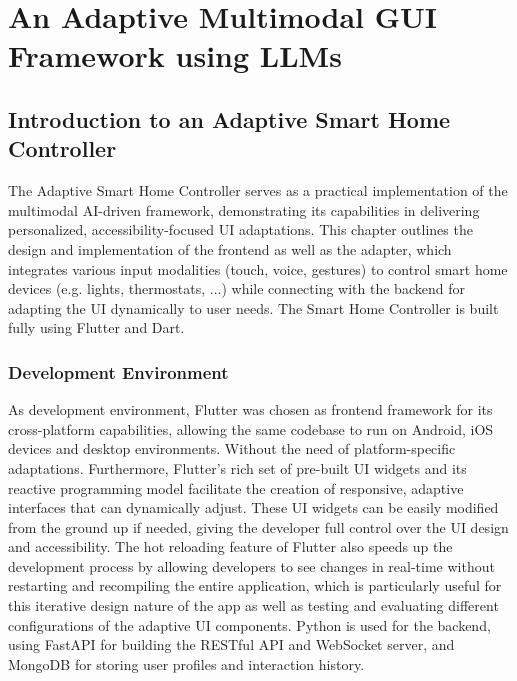 \documentclass[openany]{book}
\begin{document}
\chapter{An Adaptive Multimodal GUI Framework using LLMs}

\section{Introduction to an Adaptive Smart Home Controller}
The Adaptive Smart Home Controller serves as a practical implementation of the multimodal AI-driven framework, demonstrating its capabilities in delivering personalized, accessibility-focused UI adaptations. This chapter outlines the design and implementation of the frontend as well as the adapter, which integrates various input modalities (touch, voice, gestures) to control smart home devices (e.g. lights, thermostats, ...) while connecting with the backend for adapting the UI dynamically to user needs. The Smart Home Controller is built fully using Flutter and Dart.

\subsection{Development Environment}
As development environment, Flutter was chosen as frontend framework for its cross-platform capabilities, allowing the same codebase to run on Android, iOS devices and desktop environments. Without the need of platform-specific adaptations. Furthermore, Flutter's rich set of pre-built UI widgets and its reactive programming model facilitate the creation of responsive, adaptive interfaces that can dynamically adjust. These UI widgets can be easily modified from the ground up if needed, giving the developer full control over the UI design and accessibility. The hot reloading feature of Flutter also speeds up the development process by allowing developers to see changes in real-time without restarting and recompiling the entire application, which is particularly useful for this iterative design nature of the app as well as testing and evaluating different configurations of the adaptive UI components. Python is used for the backend, using FastAPI for building the RESTful API and WebSocket server, and MongoDB for storing user profiles and interaction history.
\end{document}
